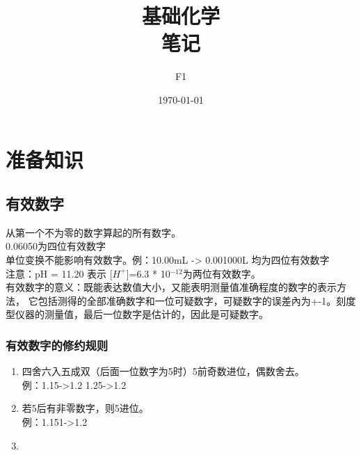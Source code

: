 \documentclass[12pt, a4paper, oneside]{ctexbook}
\title{{\Huge{\textbf{基础化学}}}\\笔记}
\author{F1}
\date{\today}
\begin{document}
\maketitle

\setcounter{page}{1}



{}
\setcounter{page}{1}
\tableofcontents
\newpage
\setcounter{page}{1}

\chapter{准备知识}


\section*{有效数字}
从第一个不为零的数字算起的所有数字。\\
0.06050为四位有效数字\\
单位变换不能影响有效数字。例：10.00mL -> 0.001000L 均为四位有效数字\\
注意：pH = 11.20 表示 [$H^+$]=6.3 * 10$^{-12}$为两位有效数字。\\
有效数字的意义：既能表达数值大小，又能表明测量值准确程度的数字的表示方法，
它包括测得的全部准确数字和一位可疑数字，可疑数字的误差內为+-1。刻度型仪器的测量值，最后一位数字是估计的，因此是可疑数字。\\
\subsection*{有效数字的修约规则}
\begin{enumerate}
    \item 四舍六入五成双（后面一位数字为5时）5前奇数进位，偶数舍去。\\例：1.15->1.2 1.25->1.2
    \item 若5后有非零数字，则5进位。\\例：1.151->1.2
    \item 
\end{enumerate}
\end{document}
